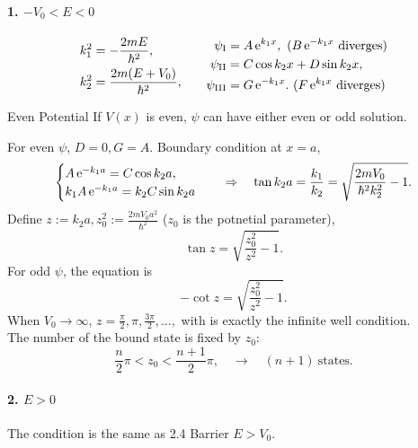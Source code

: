 \documentclass{article}
\begin{document}
\paragraph{1. $-V_0<E<0$}
\begin{align*}
	\begin{aligned}
		k_1^2 & =-\frac{2mE}{\hbar^2},      \\
		k_2^2 & =\frac{2m(E+V_0)}{\hbar^2},
	\end{aligned}\qquad
	\begin{aligned}
		\psi_{\mathrm{I}}   & =A\mathop{}\!\mathrm{e}^{k_1x},~(B\mathop{}\!\mathrm{e}^{-k_1x}~{\rm diverges}) \\
		\psi_{\mathrm{II}}  & =C\cos{k_2x}+D\sin{k_2x},               \\
		\psi_{\mathrm{III}} & =G\mathop{}\!\mathrm{e}^{-k_1x}.~(F\mathop{}\!\mathrm{e}^{k_1x}~{\rm diverges})
	\end{aligned}
\end{align*}
\begin{theorem}{Even Potential}{}
	If $V(x)$ is even, $\psi$ can have either even or odd solution.
\end{theorem}
For even $\psi$, $D=0,G=A$. Boundary condition at $x=a$,
\begin{align*}
	\begin{cases}
		A\mathop{}\!\mathrm{e}^{-k_1a}=C\cos k_2a, \\
		k_1A\mathop{}\!\mathrm{e}^{-k_1a}=k_2C\sin k_2a
	\end{cases}
	\quad\Rightarrow\quad
	\tan k_2a=\frac{k_1}{k_2}=\sqrt{\frac{2mV_0}{\hbar^2k_2^2}-1}.
\end{align*}
Define $z:=k_2a,z_0^2:=\frac{2mV_0a^2}{\hbar^2}$ ($z_0$ is the potnetial parameter),
$$\tan z=\sqrt{\frac{z_0^2}{z^2}-1}.$$
For odd $\psi$, the equation is
$$-\cot z=\sqrt{\frac{z_0^2}{z^2}-1}.$$
When $V_0\to\infty$, $z=\frac\pi{2},\pi,\frac{3\pi}2,\ldots,$ with is exactly the infinite well condition.\\
The number of the bound state is fixed by $z_0$:
$$\frac n2\pi<z_0<\frac{n+1}2\pi,\quad\rightarrow\quad(n+1)~\text{states.}$$
\paragraph{2. $E>0$}The condition is the same as 2.4 Barrier $E>V_0$.
\clearpage
\end{document}
